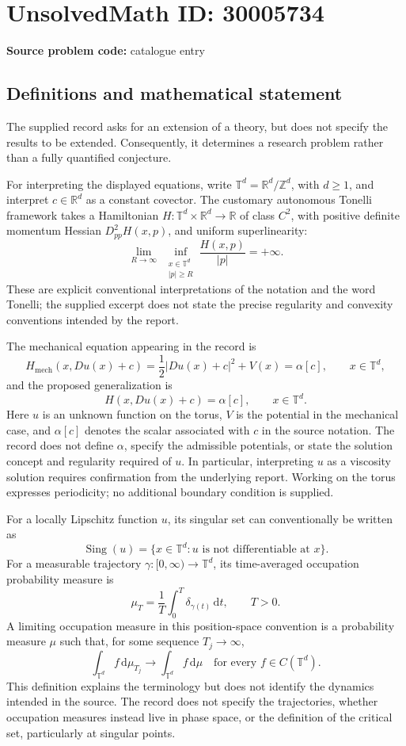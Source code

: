 \documentclass[11pt]{article}
\newcommand{\Z}{\mathbb{Z}}
\newcommand{\R}{\mathbb{R}}
\begin{document}
\section*{UnsolvedMath ID: 30005734}
\textbf{Source problem code:} catalogue entry
\subsection{Definitions and mathematical statement}
The supplied record asks for an extension of a theory, but does not specify the results to be extended. Consequently, it determines a research problem rather than a fully quantified conjecture.

For interpreting the displayed equations, write \(\mathbb T^d=\R^d/\Z^d\), with \(d\geq 1\), and interpret \(c\in\R^d\) as a constant covector. The customary autonomous Tonelli framework takes a Hamiltonian \(H\colon\mathbb T^d\times\R^d\to\R\) of class \(C^2\), with positive definite momentum Hessian \(D^2_{pp}H(x,p)\), and uniform superlinearity:
\[
\lim_{R\to\infty}\ \inf_{\substack{x\in\mathbb T^d\\ |p|\geq R}}
\frac{H(x,p)}{|p|}=+\infty.
\]
These are explicit conventional interpretations of the notation and the word Tonelli; the supplied excerpt does not state the precise regularity and convexity conventions intended by the report.

The mechanical equation appearing in the record is
\[
H_{\mathrm{mech}}(x,Du(x)+c)
=\frac12|Du(x)+c|^2+V(x)=\alpha[c],
\qquad x\in\mathbb T^d,
\]
and the proposed generalization is
\[
H(x,Du(x)+c)=\alpha[c],
\qquad x\in\mathbb T^d.
\]
Here \(u\) is an unknown function on the torus, \(V\) is the potential in the mechanical case, and \(\alpha[c]\) denotes the scalar associated with \(c\) in the source notation. The record does not define \(\alpha\), specify the admissible potentials, or state the solution concept and regularity required of \(u\). In particular, interpreting \(u\) as a viscosity solution requires confirmation from the underlying report. Working on the torus expresses periodicity; no additional boundary condition is supplied.

For a locally Lipschitz function \(u\), its singular set can conventionally be written as
\[
\operatorname{Sing}(u)=\{x\in\mathbb T^d: u\text{ is not differentiable at }x\}.
\]
For a measurable trajectory \(\gamma\colon[0,\infty)\to\mathbb T^d\), its time-averaged occupation probability measure is
\[
\mu_T=\frac1T\int_0^T\delta_{\gamma(t)}\,\mathrm dt,
\qquad T>0.
\]
A limiting occupation measure in this position-space convention is a probability measure \(\mu\) such that, for some sequence \(T_j\to\infty\),
\[
\int_{\mathbb T^d}f\,\mathrm d\mu_{T_j}
\longrightarrow
\int_{\mathbb T^d}f\,\mathrm d\mu
\quad\text{for every }f\in C(\mathbb T^d).
\]
This definition explains the terminology but does not identify the dynamics intended in the source. The record does not specify the trajectories, whether occupation measures instead live in phase space, or the definition of the critical set, particularly at singular points.
\end{document}
